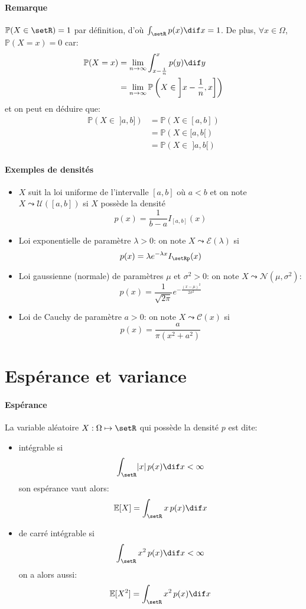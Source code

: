\documentclass[a4paper,10pt,french,openany]{memoir}
\newcommand{\Proba}{\mathbb{P}}
\newcommand{\Esper}{\mathbb{E}}
\newcommand{\normale}{\mathcal{N}}
\newcommand{\uniforme}{\mathcal{U}}
\newcommand{\cauchy}{\mathcal{C}}
\newcommand{\expo}{\mathcal{E}}
\newcommand{\abs}[1]{\lvert #1 \rvert}
\begin{document}
\paragraph{Remarque}
$\Proba(X\in\setR)=1$ par définition, d'où $\int_{\setR} p(x) \dif x = 1$. De plus, $\forall x \in \Omega$, $\Proba(X=x)=0$ car:
\begin{align*}
    \Proba(X=x) &= \lim_{n\to\infty} \int_{x-\frac1n}^x p(y) \dif y \\
    &= \lim_{n\to\infty} \Proba\left(X\in\left]x-\frac1n,x\right]\right)
\end{align*}
et on peut en déduire que:
\begin{align*}
    \Proba(X\in\;]a,b]) &= \Proba(X\in[a,b]) \\
    &= \Proba(X\in[a,b[) \\
    &= \Proba(X\in\;]a,b[)
\end{align*}

\paragraph{Exemples de densités}
\begin{itemize}
 \item $X$ suit la loi uniforme de l'intervalle $[a,b]$ où $a<b$ et on note $X\leadsto\uniforme([a,b])$ si $X$ possède la densité \[p(x)=\frac1{b-a}I_{[a,b]}(x)\]
 
 \item Loi exponentielle de paramètre $\lambda>0$: on note $X\leadsto\expo(\lambda)$ si \[p(x)=\lambda e^{-\lambda x} I_{\setRp}(x)\]
 
 \item Loi gaussienne (normale) de paramètres $\mu$ et $\sigma^2>0$: on note $X\leadsto\normale(\mu,\sigma^2)$: \[p(x)=\frac1{\sqrt{2\pi}} e^{-\frac{(x-\mu)^2}{2\sigma^2}}\]
 
 \item Loi de Cauchy de paramètre $a>0$: on note $X\leadsto\cauchy(x)$ si \[p(x)=\frac{a}{\pi(x^2+a^2)}\]
\end{itemize}

\section{Espérance et variance}

\paragraph{Espérance}
La variable aléatoire $X:\Omega\mapsto\setR$ qui possède la densité $p$ est dite:
\begin{itemize}
 \item intégrable si \[\int_{\setR} \abs{x}\,p(x) \dif x < \infty\]
 son espérance vaut alors: \[\Esper[X] = \int_{\setR} x\,p(x) \dif x\]
 
 \item de carré intégrable si \[\int_{\setR} x^2\,p(x) \dif x < \infty\]
 on a alors aussi: \[\Esper[X^2] = \int_{\setR} x^2\,p(x)\dif x\]
\end{itemize}
\end{document}
